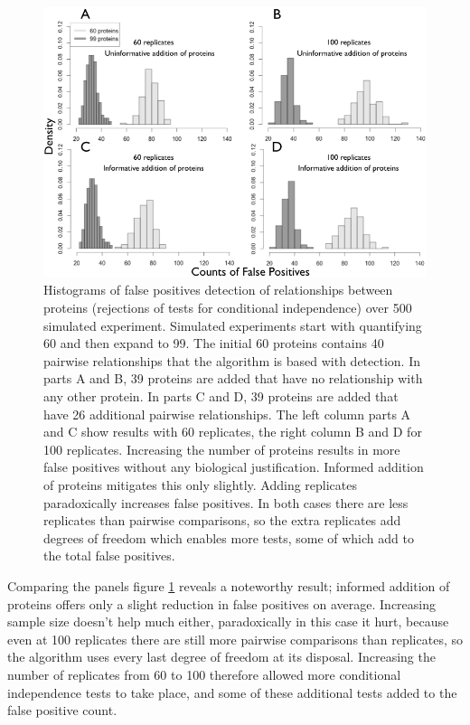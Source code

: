 \documentclass[journal=jacsat,manuscript=article]{achemso}
\def\added#1{{\color{blue} #1}}
\begin{document}
\begin{figure}[!tpb]
\centerline{\includegraphics[width=.8\textwidth]{figs/spurious_dep2.png}}
\caption{Histograms of false positives detection of relationships between proteins (rejections of tests for conditional independence) over 500 simulated experiment.  Simulated experiments start with quantifying 60 and then expand to 99.  The initial 60 proteins contains 40 pairwise relationships that the algorithm is based with detection.  In parts A and B, 39 proteins are added that have no relationship with any other protein.  In parts C and D, 39 proteins are added that have 26 additional pairwise relationships. The left column parts A and C show results with 60 replicates, the right column B and D for 100 replicates.  Increasing the number of proteins results in more false positives without any biological justification.  Informed addition of proteins mitigates this only slightly.  Adding replicates paradoxically increases false positives.  In both cases there are less replicates than pairwise comparisons, so the extra replicates add degrees of freedom which enables more tests, some of which add to the total false positives.}
\label{spur_dep}
\end{figure}

\added{Comparing the panels figure \ref{spur_dep} reveals a noteworthy result; informed addition of proteins offers only a slight reduction in false positives on average.  Increasing sample size doesn't help much either, paradoxically in this case it hurt, because even at 100 replicates there are still  more pairwise comparisons than replicates, so the algorithm uses every last degree of freedom at its disposal.  Increasing the number of replicates from 60 to 100 therefore allowed more conditional independence tests to take place, and some of these additional tests added to the false positive count.} 
\end{document}
